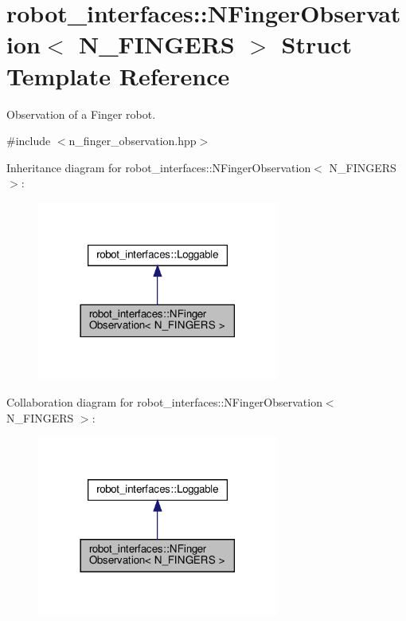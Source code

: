 \hypertarget{structrobot__interfaces_1_1NFingerObservation}{}\section{robot\+\_\+interfaces\+:\+:N\+Finger\+Observation$<$ N\+\_\+\+F\+I\+N\+G\+E\+RS $>$ Struct Template Reference}
\label{structrobot__interfaces_1_1NFingerObservation}


Observation of a Finger robot.  




{\ttfamily \#include $<$n\+\_\+finger\+\_\+observation.\+hpp$>$}



Inheritance diagram for robot\+\_\+interfaces\+:\+:N\+Finger\+Observation$<$ N\+\_\+\+F\+I\+N\+G\+E\+RS $>$\+:
\nopagebreak
\begin{figure}[H]
\begin{center}
\leavevmode
\includegraphics[width=225pt]{structrobot__interfaces_1_1NFingerObservation__inherit__graph}
\end{center}
\end{figure}


Collaboration diagram for robot\+\_\+interfaces\+:\+:N\+Finger\+Observation$<$ N\+\_\+\+F\+I\+N\+G\+E\+RS $>$\+:
\nopagebreak
\begin{figure}[H]
\begin{center}
\leavevmode
\includegraphics[width=225pt]{structrobot__interfaces_1_1NFingerObservation__coll__graph}
\end{center}
\end{figure}
